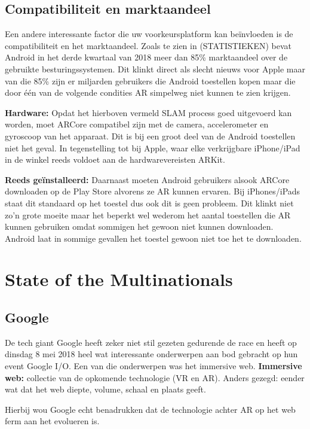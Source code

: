 \subsection{Compatibiliteit en marktaandeel}

Een andere interessante factor die uw voorkeursplatform kan beïnvloeden is de compatibiliteit en het marktaandeel. Zoals te zien in (STATISTIEKEN) bevat Android in het derde kwartaal van 2018 meer dan 85\% marktaandeel over de gebruikte besturingssystemen. Dit klinkt direct als slecht nieuws voor Apple maar van die 85\% zijn er miljarden gebruikers die Android toestellen kopen maar die door één van de volgende condities AR simpelweg niet kunnen te zien krijgen. 

\textbf{Hardware:}
Opdat het hierboven vermeld SLAM process goed uitgevoerd kan worden, moet ARCore compatibel zijn met de camera, accelerometer en gyroscoop van het apparaat. Dit is bij een groot deel van de Android toestellen niet het geval. In tegenstelling tot bij Apple, waar elke verkrijgbare iPhone/iPad in de winkel reeds voldoet aan de hardwarevereisten ARKit. 

\textbf{Reeds geïnstalleerd:}
Daarnaast moeten Android gebruikers alsook ARCore downloaden op de Play Store alvorens ze AR kunnen ervaren. Bij iPhones/iPads staat dit standaard op het toestel dus ook dit is geen probleem. Dit klinkt niet zo'n grote moeite maar het beperkt wel wederom het aantal toestellen die AR kunnen gebruiken omdat sommigen het gewoon niet kunnen downloaden. Android laat in sommige gevallen het toestel gewoon niet toe het te downloaden. 
 
\section{State of the Multinationals}
\label{sec:state-of-the-multinationals}
  

\subsection{Google}
De tech giant Google heeft zeker niet stil gezeten gedurende de race en heeft op dinsdag 8 mei 2018 heel wat interessante onderwerpen aan bod gebracht op hun event Google I/O. Een van die onderwerpen was het immersive web.
\textbf{Immersive web:} 
collectie van de opkomende technologie (VR en AR). Anders gezegd: eender wat dat het web diepte, volume, schaal en plaats geeft.

Hierbij wou Google echt benadrukken dat de technologie achter AR op het web ferm aan het evolueren is. 
 
